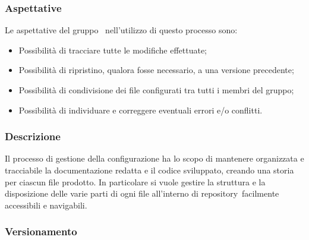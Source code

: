     \subsubsection{Aspettative}
    Le aspettative del gruppo \groupName\ nell'utilizzo di questo processo sono:
    \begin{itemize}
        \item Possibilità di tracciare tutte le modifiche effettuate;
        \item Possibilità di ripristino, qualora fosse necessario, a una versione precedente;
        \item Possibilità di condivisione dei file configurati tra tutti i membri del gruppo;
        \item Possibilità di individuare e correggere eventuali errori e/o conflitti.
    \end{itemize}

    \subsubsection{Descrizione}
    Il processo di gestione della configurazione ha lo scopo di mantenere organizzata e tracciabile la documentazione redatta e il codice sviluppato, creando una storia per ciascun file prodotto.
    In particolare si vuole gestire la struttura e la disposizione delle varie parti di ogni file all'interno di repository\glo\ facilmente accessibili e navigabili.

    \subsubsection{Versionamento}

